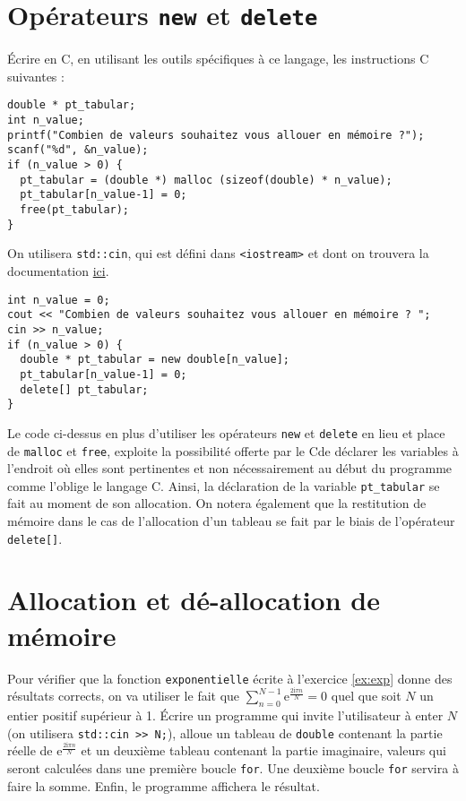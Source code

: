 \documentclass{book}
\newcommand{\inline}[1]{\texttt{#1}}
\newcommand{\cpp}{\mbox{C\vspace{.5em}\protect\raisebox{.2ex}{\footnotesize++~}}}
\begin{document}
\section{Opérateurs \texttt{new} et \texttt{delete}}

Écrire en \cpp, en utilisant les outils spécifiques à ce langage, les
instructions C suivantes :

\begin{verbatim}
double * pt_tabular;
int n_value;
printf("Combien de valeurs souhaitez vous allouer en mémoire ?");
scanf("%d", &n_value);
if (n_value > 0) {
  pt_tabular = (double *) malloc (sizeof(double) * n_value);
  pt_tabular[n_value-1] = 0;
  free(pt_tabular);
}
\end{verbatim}

On utilisera \inline{std::cin}, qui est défini dans \inline{<iostream>} et dont on trouvera la documentation \href{https://en.cppreference.com/w/cpp/io/cin}{ici}.

\begin{correction}

\begin{verbatim}
int n_value = 0;
cout << "Combien de valeurs souhaitez vous allouer en mémoire ? ";
cin >> n_value;
if (n_value > 0) {
  double * pt_tabular = new double[n_value];
  pt_tabular[n_value-1] = 0;
  delete[] pt_tabular;
}
\end{verbatim}

Le code ci-dessus en plus d'utiliser les opérateurs \texttt{new} et \texttt{delete} en lieu et
place de \texttt{malloc} et \texttt{free}, exploite la possibilité offerte par le \cpp de déclarer
les variables à l'endroit où elles sont pertinentes et non nécessairement au
début du programme comme l'oblige le langage C. Ainsi, la déclaration de la
variable \texttt{pt\_tabular} se fait au moment de son allocation. On notera également
que la restitution de mémoire dans le cas de l'allocation d'un tableau se fait
par le biais de l'opérateur \texttt{delete[]}.
\end{correction}


\section{Allocation et dé-allocation de mémoire} \label{ex:sum_exp}

Pour vérifier que la fonction \inline{exponentielle} écrite à l'exercice \ref{ex:exp} donne des résultats corrects, on va utiliser le fait que $\sum_{n=0}^{N-1} 
\mathrm{e}^{\frac{2\mathrm{i}\pi n}{N}} = 0$ quel que soit $N$ un entier positif supérieur à 1. Écrire un programme qui invite l'utilisateur à enter $N$ (on utilisera \inline{std::cin >> N;}), alloue un tableau de \inline{double} contenant la partie réelle de 
$\mathrm{e}^{\frac{2\mathrm{i}\pi n}{N}}$ et un  deuxième tableau contenant la partie imaginaire, valeurs qui seront calculées dans une première boucle \inline{for}. Une deuxième 
boucle \inline{for} servira à faire la somme. Enfin, le programme affichera le résultat.
\end{document}
